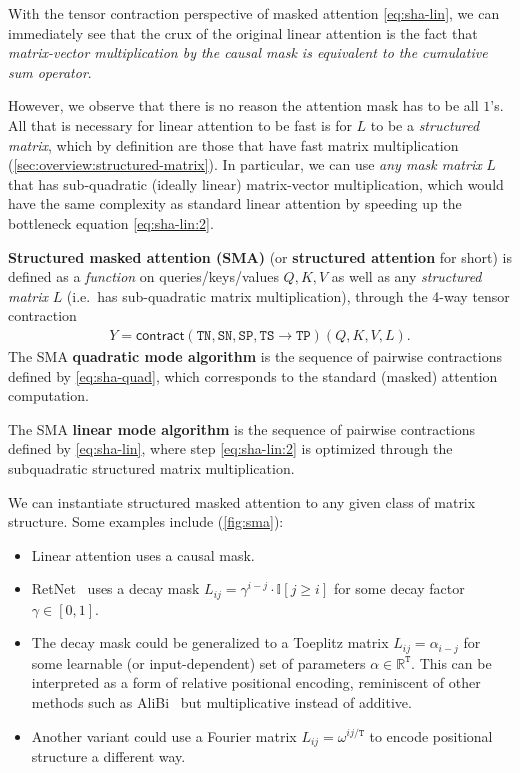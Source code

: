 With the tensor contraction perspective of masked attention \eqref{eq:sha-lin},
we can immediately see that the crux of the original linear attention is the fact that \emph{matrix-vector multiplication by the causal mask is equivalent to the cumulative sum operator}.

However, we observe that there is no reason the attention mask has to be all $1$'s. All that is necessary for linear attention to be fast is for $L$ to be a \emph{structured matrix}, which by definition are those that have fast matrix multiplication (\ref{sec:overview:structured-matrix}).
In particular, we can use \emph{any mask matrix} $L$ that has sub-quadratic (ideally linear) matrix-vector multiplication, which would have the same complexity as standard linear attention by speeding up the bottleneck equation \eqref{eq:sha-lin:2}.

\begin{definition}
  \label{def:sma}
  \textbf{Structured masked attention (SMA)} (or \textbf{structured attention} for short) is defined as a \emph{function} on queries/keys/values $Q, K, V$ as well as any \emph{structured matrix} $L$ (i.e.\ has sub-quadratic matrix multiplication), through the 4-way tensor contraction
  \begin{align*}
    Y = \mathsf{contract}(\mathtt{TN},\mathtt{SN},\mathtt{SP},\mathtt{TS} \to \mathtt{TP})(Q, K, V, L) .
  \end{align*}
  The SMA \textbf{quadratic mode algorithm} is the sequence of pairwise contractions defined by \eqref{eq:sha-quad},
  which corresponds to the standard (masked) attention computation.

  The SMA \textbf{linear mode algorithm} is the sequence of pairwise contractions defined by \eqref{eq:sha-lin},
  where step \eqref{eq:sha-lin:2} is optimized through the subquadratic structured matrix multiplication.
\end{definition}

We can instantiate structured masked attention to any given class of matrix structure. Some examples include (\ref{fig:sma}):

\begin{itemize}
  \item Linear attention uses a causal mask.
  \item RetNet~\citep{sun2023retentive} uses a decay mask $L_{ij} = \gamma^{i-j} \cdot \mathbb{I}[j \ge i]$ for some decay factor $\gamma \in [0, 1]$.
  \item The decay mask could be generalized to a Toeplitz matrix $L_{ij} = \alpha_{i-j}$ for some learnable (or input-dependent) set of parameters $\alpha \in \mathbb{R}^\mathtt{T}$. This can be interpreted as a form of relative positional encoding, reminiscent of other methods such as AliBi~\citep{press2022train} but multiplicative instead of additive.
  \item Another variant could use a Fourier matrix $L_{ij} = \omega^{ij / \mathtt{T}}$ to encode positional structure a different way.
\end{itemize}

